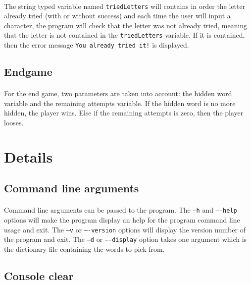 \documentclass{report}
\begin{document}
\paragraph{} The string typed variable named \texttt{triedLetters} will
contains in order the letter already tried (with or without success) and each
time the user will input a character, the program will check that the letter
was not already tried, meaning that the letter is not contained in the
\texttt{triedLetters} variable. If it is contained, then the error message
\texttt{You already tried it!} is displayed.

\subsection{Endgame}

\paragraph{} For the end game, two parameters are taken into account: the
hidden word variable and the remaining attempts variable. If the hidden word is
no more hidden, the player wins. Else if the remaining attempts is zero, then
the player looses.

\section{Details}

\subsection{Command line arguments}

\paragraph{} Command line arguments can be passed to the program. The
\texttt{--h} and \texttt{----help} options will make the program display an
help for the program command line usage and exit. The \texttt{--v} or
\texttt{----version} options will display the version number of the program and
exit. The \texttt{--d} or \texttt{----display} option takes one argument which
is the dictionary file containing the words to pick from.

\subsection{Console clear}
\end{document}
